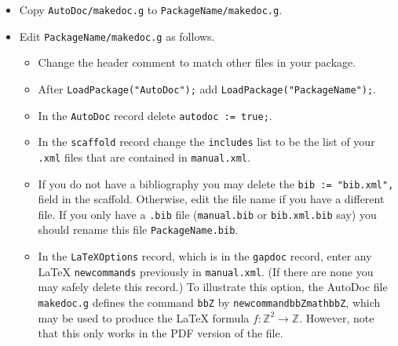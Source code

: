 \documentclass[a4paper,11pt]{report}
\newcommand{\bbZ}{\mathbb{Z}}
\begin{document}
{{{ 
\begin{itemize}
\item  Copy \texttt{AutoDoc/makedoc.g} to \texttt{PackageName/makedoc.g}. 
\item  Edit \texttt{PackageName/makedoc.g} as follows. 
\begin{itemize}
\item  Change the header comment to match other files in your package. 
\item  After \texttt{LoadPackage("AutoDoc");} add \texttt{LoadPackage("PackageName");}. 
\item  In the \texttt{AutoDoc} record delete \texttt{autodoc := true;}. 
\item  {} In the \texttt{scaffold} record change the \texttt{includes} list to be the list of your \texttt{.xml} files that are contained in \texttt{manual.xml}. 
\item  {} If you do not have a bibliography you may delete the \texttt{bib := "bib.xml",} field in the scaffold. Otherwise, edit the file name if you have a different
file. If you only have a \texttt{.bib} file (\texttt{manual.bib} or \texttt{bib.xml.bib} say) you should rename this file \texttt{PackageName.bib}. 
\item  {} In the \texttt{LaTeXOptions} record, which is in the \texttt{gapdoc} record, enter any {\LaTeX} \texttt{newcommands} previously in \texttt{manual.xml}. (If there are none you may safely delete this record.) To illustrate this
option, the \textsf{AutoDoc} file \texttt{makedoc.g} defines the command \texttt{\texttt{}bbZ} by \texttt{\texttt{}newcommand\texttt{}\texttt{}bbZ\texttt{}\texttt{}\texttt{}mathbb\texttt{}Z\texttt{}\texttt{}}, which may be used to produce the {\LaTeX} formula $f : \bbZ^2 \to \bbZ$. However, note that this only works in the PDF version of the file. 
\end{itemize}
 

\end{itemize}}}}
\end{document}
